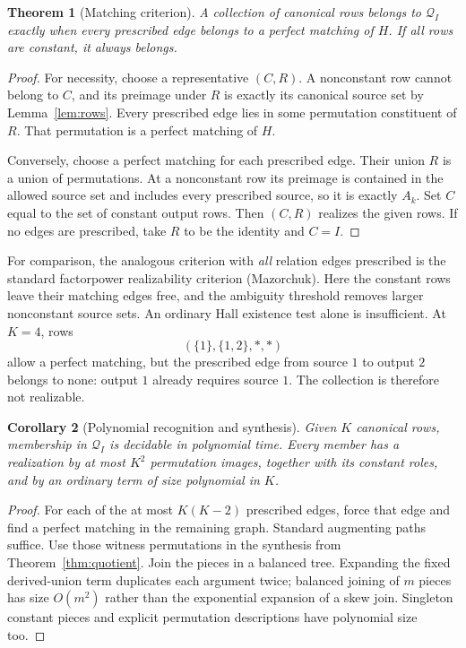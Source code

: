 \documentclass[11pt]{article}
\newtheorem{theorem}{Theorem}[section]
\newtheorem{corollary}[theorem]{Corollary}
\begin{document}
\begin{theorem}[Matching criterion]\label{thm:matching}
A collection of canonical rows belongs to $\mathcal Q_I$ exactly when
every prescribed edge belongs to a perfect matching of $H$. If all rows
are constant, it always belongs.
\end{theorem}
\begin{proof}
For necessity, choose a representative $(C,R)$. A nonconstant row
cannot belong to $C$, and its preimage under $R$ is exactly its canonical
source set by Lemma~\ref{lem:rows}. Every prescribed edge lies in some
permutation constituent of $R$. That permutation is a perfect matching
of $H$.

Conversely, choose a perfect matching for each prescribed edge. Their
union $R$ is a union of permutations. At a nonconstant row its preimage
is contained in the allowed source set and includes every prescribed
source, so it is exactly $A_k$. Set $C$ equal to the set of constant
output rows. Then $(C,R)$ realizes the given rows. If no edges are
prescribed, take $R$ to be the identity and $C=I$.
\end{proof}

For comparison, the analogous criterion with \emph{all} relation edges
prescribed is the standard factorpower realizability criterion
(Mazorchuk\cite[Section~2.1]{Mazorchuk2009}). Here the constant rows leave
their matching edges free, and the ambiguity threshold removes larger
nonconstant source sets. An ordinary Hall existence test alone is
insufficient. At $K=4$, rows
\[
 (\{1\},\{1,2\},*,*)
\]
allow a perfect matching, but the prescribed edge from source $1$ to
output $2$ belongs to none: output $1$ already requires source $1$.
The collection is therefore not realizable.

\begin{corollary}[Polynomial recognition and synthesis]
Given $K$ canonical rows, membership in $\mathcal Q_I$ is decidable in
polynomial time. Every member has a realization by at most $K^2$
permutation images, together with its constant roles, and by an ordinary
term of size polynomial in $K$.
\end{corollary}
\begin{proof}
For each of the at most $K(K-2)$ prescribed edges, force that edge and
find a perfect matching in the remaining graph. Standard augmenting
paths suffice. Use those witness permutations in the synthesis from
Theorem~\ref{thm:quotient}. Join the pieces in a balanced tree. Expanding
the fixed derived-union term duplicates each argument twice; balanced
joining of $m$ pieces has size $O(m^2)$ rather than the exponential
expansion of a skew join. Singleton constant pieces and explicit
permutation descriptions have polynomial size too.
\end{proof}
\end{document}
